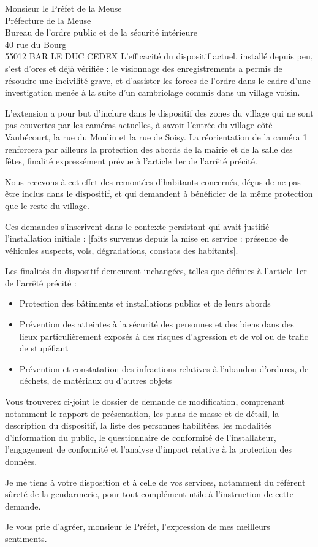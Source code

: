 \documentclass[12pt]{lettre}
\begin{document}
\begin{letter}{Monsieur le Préfet de la Meuse\\Préfecture de la Meuse\\Bureau de l'ordre public et de la sécurité intérieure\\40 rue du Bourg\\55012 BAR LE DUC CEDEX}
L'efficacité du dispositif actuel, installé depuis peu, s'est d'ores et déjà vérifiée : le visionnage des enregistrements a permis de résoudre une incivilité grave, et d'assister les forces de l'ordre dans le cadre d'une investigation menée à la suite d'un cambriolage commis dans un village voisin.

L'extension a pour but d'inclure dans le dispositif des zones du village qui ne sont pas couvertes par les caméras actuelles, à savoir l'entrée du village côté Vaubécourt, la rue du Moulin et la rue de Soisy. La réorientation de la caméra 1 renforcera par ailleurs la protection des abords de la mairie et de la salle des fêtes, finalité expressément prévue à l'article 1er de l'arrêté précité.

Nous recevons à cet effet des remontées d'habitants concernés, déçus de ne pas être inclus dans le dispositif, et qui demandent à bénéficier de la même protection que le reste du village.

Ces demandes s'inscrivent dans le contexte persistant qui avait justifié l'installation initiale : [faits survenus depuis la mise en service : présence de véhicules suspects, vols, dégradations, constats des habitants].

Les finalités du dispositif demeurent inchangées, telles que définies à l'article 1er de l'arrêté précité :

\begin{itemize}
\item Protection des bâtiments et installations publics et de leurs abords
\item Prévention des atteintes à la sécurité des personnes et des biens dans des lieux particulièrement exposés à des risques d'agression et de vol ou de trafic de stupéfiant
\item Prévention et constatation des infractions relatives à l'abandon d'ordures, de déchets, de matériaux ou d'autres objets
\end{itemize}

Vous trouverez ci-joint le dossier de demande de modification, comprenant notamment le rapport de présentation, les plans de masse et de détail, la description du dispositif, la liste des personnes habilitées, les modalités d'information du public, le questionnaire de conformité de l'installateur, l'engagement de conformité et l'analyse d'impact relative à la protection des données.

Je me tiens à votre disposition et à celle de vos services, notamment du référent sûreté de la gendarmerie, pour tout complément utile à l'instruction de cette demande.

Je vous prie d'agréer, monsieur le Préfet, l'expression de mes meilleurs sentiments.

\closing{}
\end{letter}
\end{document}
